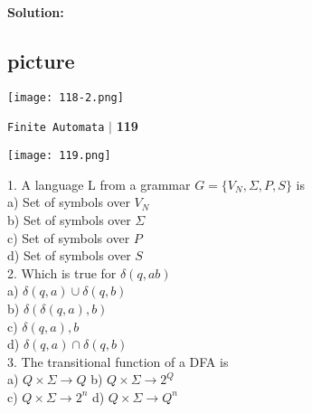 \documentclass{article}
\begin{document}
\textbf{Solution:}\\
\begin{center}
\section{picture}
\texttt{[image: 118-2.png]}
\end{center}

\begin{flushright}
 \texttt{Finite Automata} \hspace*{0.1cm}\textbf{$|$} \hspace*{0.1cm} \textbf{119}\hspace*{0.1cm}
\end{flushright}


\begin{center}
\texttt{[image: 119.png]}
\end{center}


1. A language L from a grammar $G = \{V_N, \Sigma,P, S\}$ is\\
\hspace*{0.5cm} a) Set of symbols over $V_N$ \\
\hspace*{0.5cm} b) Set of symbols over $\Sigma$ \\
\hspace*{0.5cm} c) Set of symbols over $P$ \\
\hspace*{0.5cm} d) Set of symbols over $S$ \\

\vspace*{0.2cm}
2. Which is true for $\delta(q, ab)$ \\
\hspace*{0.5cm} a) $\delta(q, a) \cup \delta(q, b)$ \\
\hspace*{0.5cm} b) $\delta(\delta(q, a), b)$ \\
\hspace*{0.5cm} c) $\delta(q, a), b$ \\
\hspace*{0.5cm} d) $\delta(q, a) \cap \delta(q, b)$ \\

\vspace*{0.2cm}
3. The transitional function of a DFA is\\
\hspace*{0.5cm} a) $Q \times \Sigma \rightarrow Q$    \hspace*{0.7cm}  b) $Q \times \Sigma \rightarrow 2^Q$\\
\hspace*{0.5cm} c) $Q \times \Sigma \rightarrow 2^n$  \hspace*{0.7cm}  d) $Q \times \Sigma \rightarrow Q^n$\\
\end{document}
